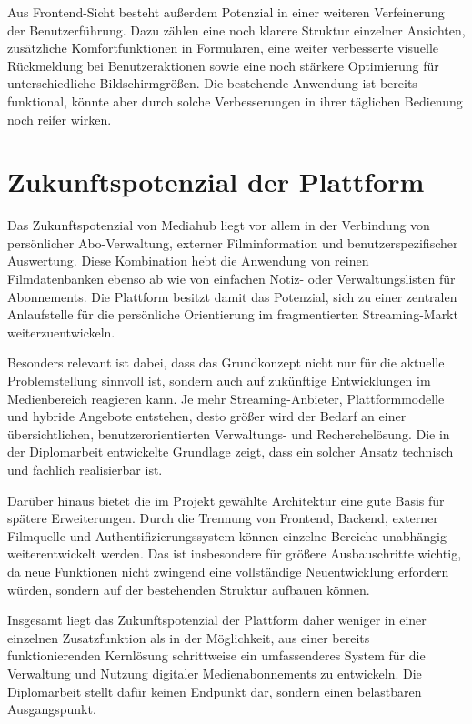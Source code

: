 Aus Frontend-Sicht besteht außerdem Potenzial in einer weiteren Verfeinerung der Benutzerführung. Dazu zählen eine noch klarere Struktur einzelner Ansichten, zusätzliche Komfortfunktionen in Formularen, eine weiter verbesserte visuelle Rückmeldung bei Benutzeraktionen sowie eine noch stärkere Optimierung für unterschiedliche Bildschirmgrößen. Die bestehende Anwendung ist bereits funktional, könnte aber durch solche Verbesserungen in ihrer täglichen Bedienung noch reifer wirken.

\section{Zukunftspotenzial der Plattform}
Das Zukunftspotenzial von Mediahub liegt vor allem in der Verbindung von persönlicher Abo-Verwaltung, externer Filminformation und benutzerspezifischer Auswertung. Diese Kombination hebt die Anwendung von reinen Filmdatenbanken ebenso ab wie von einfachen Notiz- oder Verwaltungslisten für Abonnements. Die Plattform besitzt damit das Potenzial, sich zu einer zentralen Anlaufstelle für die persönliche Orientierung im fragmentierten Streaming-Markt weiterzuentwickeln.

Besonders relevant ist dabei, dass das Grundkonzept nicht nur für die aktuelle Problemstellung sinnvoll ist, sondern auch auf zukünftige Entwicklungen im Medienbereich reagieren kann. Je mehr Streaming-Anbieter, Plattformmodelle und hybride Angebote entstehen, desto größer wird der Bedarf an einer übersichtlichen, benutzerorientierten Verwaltungs- und Recherchelösung. Die in der Diplomarbeit entwickelte Grundlage zeigt, dass ein solcher Ansatz technisch und fachlich realisierbar ist.

Darüber hinaus bietet die im Projekt gewählte Architektur eine gute Basis für spätere Erweiterungen. Durch die Trennung von Frontend, Backend, externer Filmquelle und Authentifizierungssystem können einzelne Bereiche unabhängig weiterentwickelt werden. Das ist insbesondere für größere Ausbauschritte wichtig, da neue Funktionen nicht zwingend eine vollständige Neuentwicklung erfordern würden, sondern auf der bestehenden Struktur aufbauen können.

Insgesamt liegt das Zukunftspotenzial der Plattform daher weniger in einer einzelnen Zusatzfunktion als in der Möglichkeit, aus einer bereits funktionierenden Kernlösung schrittweise ein umfassenderes System für die Verwaltung und Nutzung digitaler Medienabonnements zu entwickeln. Die Diplomarbeit stellt dafür keinen Endpunkt dar, sondern einen belastbaren Ausgangspunkt.

